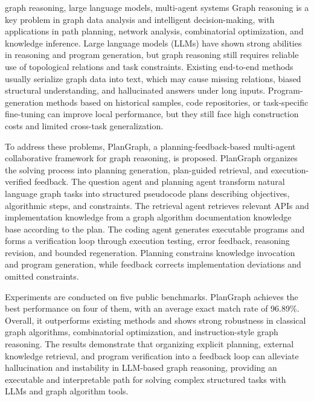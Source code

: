 \begin{englishabstract}{graph reasoning, large language models, multi-agent systems}
Graph reasoning is a key problem in graph data analysis and intelligent decision-making, with applications in path planning, network analysis, combinatorial optimization, and knowledge inference. Large language models (LLMs) have shown strong abilities in reasoning and program generation, but graph reasoning still requires reliable use of topological relations and task constraints. Existing end-to-end methods usually serialize graph data into text, which may cause missing relations, biased structural understanding, and hallucinated answers under long inputs. Program-generation methods based on historical samples, code repositories, or task-specific fine-tuning can improve local performance, but they still face high construction costs and limited cross-task generalization.

To address these problems, PlanGraph, a planning-feedback-based multi-agent collaborative framework for graph reasoning, is proposed. PlanGraph organizes the solving process into planning generation, plan-guided retrieval, and execution-verified feedback. The question agent and planning agent transform natural language graph tasks into structured pseudocode plans describing objectives, algorithmic steps, and constraints. The retrieval agent retrieves relevant APIs and implementation knowledge from a graph algorithm documentation knowledge base according to the plan. The coding agent generates executable programs and forms a verification loop through execution testing, error feedback, reasoning revision, and bounded regeneration. Planning constrains knowledge invocation and program generation, while feedback corrects implementation deviations and omitted constraints.

Experiments are conducted on five public benchmarks. PlanGraph achieves the best performance on four of them, with an average exact match rate of 96.89\%. Overall, it outperforms existing methods and shows strong robustness in classical graph algorithms, combinatorial optimization, and instruction-style graph reasoning. The results demonstrate that organizing explicit planning, external knowledge retrieval, and program verification into a feedback loop can alleviate hallucination and instability in LLM-based graph reasoning, providing an executable and interpretable path for solving complex structured tasks with LLMs and graph algorithm tools.
\end{englishabstract}
